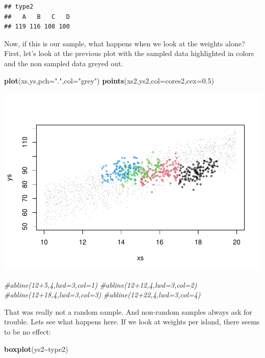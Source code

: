 \documentclass[
]{book}
\newenvironment{Shaded}{\begin{snugshade}}{\end{snugshade}}
\newcommand{\AttributeTok}[1]{\textcolor[rgb]{0.13,0.29,0.53}{#1}}
\newcommand{\CommentTok}[1]{\textcolor[rgb]{0.56,0.35,0.01}{\textit{#1}}}
\newcommand{\FloatTok}[1]{\textcolor[rgb]{0.00,0.00,0.81}{#1}}
\newcommand{\FunctionTok}[1]{\textcolor[rgb]{0.13,0.29,0.53}{\textbf{#1}}}
\newcommand{\NormalTok}[1]{#1}
\newcommand{\SpecialCharTok}[1]{\textcolor[rgb]{0.81,0.36,0.00}{\textbf{#1}}}
\newcommand{\StringTok}[1]{\textcolor[rgb]{0.31,0.60,0.02}{#1}}
\begin{document}
\begin{verbatim}
## type2
##   A   B   C   D 
## 119 116 108 100
\end{verbatim}

Now, if this is our sample, what happens when we look at the weights alone? First, let's look at the previous plot with the sampled data highlighted in colors and the non sampled data greyed out.

\begin{Shaded}
\begin{Highlighting}[]
\FunctionTok{plot}\NormalTok{(xs,ys,}\AttributeTok{pch=}\StringTok{"."}\NormalTok{,}\AttributeTok{col=}\StringTok{"grey"}\NormalTok{)}
\FunctionTok{points}\NormalTok{(xs2,ys2,}\AttributeTok{col=}\NormalTok{cores2,}\AttributeTok{cex=}\FloatTok{0.5}\NormalTok{)}
\end{Highlighting}
\end{Shaded}

\includegraphics{ECOMODbook_files/figure-latex/a10.11-1.pdf}

\begin{Shaded}
\begin{Highlighting}[]
\CommentTok{\#abline(12+5,4,lwd=3,col=1)}
\CommentTok{\#abline(12+12,4,lwd=3,col=2)}
\CommentTok{\#abline(12+18,4,lwd=3,col=3)}
\CommentTok{\#abline(12+22,4,lwd=3,col=4)}
\end{Highlighting}
\end{Shaded}

That was really not a random sample. And non-random samples always ask for trouble. Lets see what happens here. If we look at weights per island, there seems to be no effect:

\begin{Shaded}
\begin{Highlighting}[]
\FunctionTok{boxplot}\NormalTok{(ys2}\SpecialCharTok{\textasciitilde{}}\NormalTok{type2)}
\end{Highlighting}
\end{Shaded}
\end{document}
